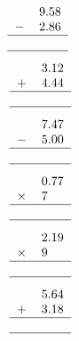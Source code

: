 \documentclass[leqno, 12pt]{article}
\begin{document}
\begin{multicols}{3}
\begin{equation}
{\begin{tabular}{c S[table-format=1.2]}
         &9.58 \tabularnewline
        $-$&2.86 \tabularnewline
        \hline
         & \tabularnewline
        \hline
    \end{tabular}}
\end{equation}
\vspace{-1pt}%
\begin{equation}
    \raisebox{-0.8cm}{
        \begin{tabular}{c S[table-format=1.2]}
         &3.12 \tabularnewline
        $+$&4.44 \tabularnewline
        \hline
         & \tabularnewline
        \hline
    \end{tabular}}
\end{equation}
\vspace{-1pt}%
\begin{equation}
    \raisebox{-0.8cm}{
        \begin{tabular}{c S[table-format=1.2]}
         &7.47 \tabularnewline
        $-$&5.00 \tabularnewline
        \hline
         & \tabularnewline
        \hline
    \end{tabular}}
\end{equation}
\vspace{-1pt}%
\begin{equation}
    \raisebox{-0.8cm}{
        \begin{tabular}{c S[table-format=1.2]}
         &0.77 \tabularnewline
        $\times$&7 \tabularnewline
        \hline
         & \tabularnewline
        \hline
    \end{tabular}}
\end{equation}
\vspace{-1pt}%
\begin{equation}
    \raisebox{-0.8cm}{
        \begin{tabular}{c S[table-format=1.2]}
         &2.19 \tabularnewline
        $\times$&9 \tabularnewline
        \hline
         & \tabularnewline
        \hline
    \end{tabular}}
\end{equation}
\vspace{-1pt}%
\begin{equation}
    \raisebox{-0.8cm}{
        \begin{tabular}{c S[table-format=1.2]}
         &5.64 \tabularnewline
        $+$&3.18 \tabularnewline
        \hline
         & \tabularnewline
        \hline
    \end{tabular}}
\end{equation}

\end{multicols}
\end{document}
